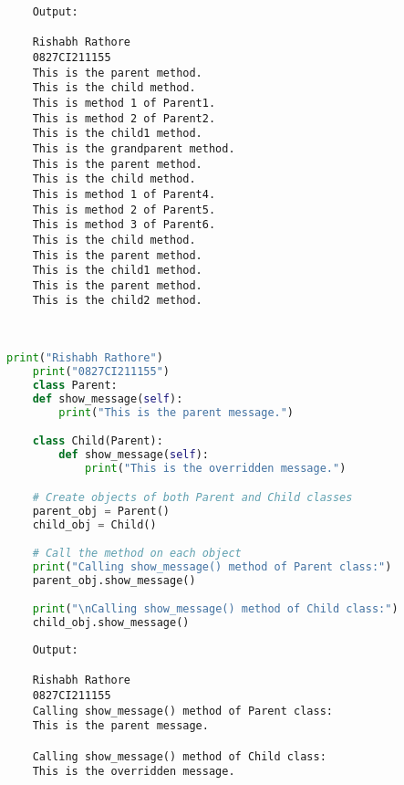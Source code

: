 \documentclass{report}
\begin{document}
\begin{verbatim}
	Output:

	Rishabh Rathore
	0827CI211155
	This is the parent method.
	This is the child method.
	This is method 1 of Parent1.
	This is method 2 of Parent2.
	This is the child1 method.
	This is the grandparent method.
	This is the parent method.
	This is the child method.
	This is method 1 of Parent4.
	This is method 2 of Parent5.
	This is method 3 of Parent6.
	This is the child method.
	This is the parent method.
	This is the child1 method.
	This is the parent method.
	This is the child2 method.

	

\end{verbatim}


\newpage



\sol 
\begin{lstlisting}[language=Python]
	print("Rishabh Rathore")
	print("0827CI211155")
	class Parent:
    def show_message(self):
        print("This is the parent message.")

	class Child(Parent):
		def show_message(self):
			print("This is the overridden message.")

	# Create objects of both Parent and Child classes
	parent_obj = Parent()
	child_obj = Child()

	# Call the method on each object
	print("Calling show_message() method of Parent class:")
	parent_obj.show_message()

	print("\nCalling show_message() method of Child class:")
	child_obj.show_message()

\end{lstlisting}

\begin{verbatim}
	Output:

	Rishabh Rathore
	0827CI211155
	Calling show_message() method of Parent class:
	This is the parent message.
	
	Calling show_message() method of Child class:
	This is the overridden message.

\end{verbatim}


\newpage
\end{document}
